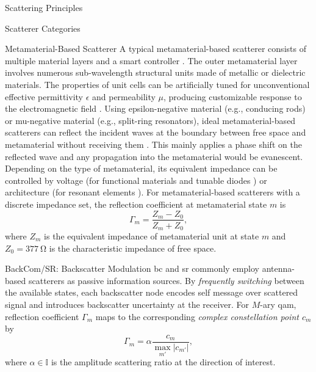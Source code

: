 \documentclass[journal]{IEEEtran}
\begin{document}
\begin{section}{Scattering Principles}
\begin{subsection}{Scatterer Categories}
		\begin{subsubsection}{Metamaterial-Based Scatterer}
			A typical metamaterial-based scatterer consists of multiple material layers and a smart controller \cite{Wu2020}.
			The outer metamaterial layer involves numerous sub-wavelength structural units made of metallic or dielectric materials.
			The properties of unit cells can be artificially tuned for unconventional effective permittivity $\epsilon$ and permeability $\mu$, producing customizable response to the electromagnetic field \cite{Zhou2021}.
			Using epsilon-negative material (e.g., conducing rods) or mu-negative material (e.g., split-ring resonators), ideal metamaterial-based scatterers can reflect the incident waves at the boundary between free space and metamaterial without receiving them \cite{Huang2021a}.
			This mainly applies a phase shift on the reflected wave and any propagation into the metamaterial would be evanescent.
			Depending on the type of metamaterial, its equivalent impedance can be controlled by voltage (for functional materials \cite{Singh2020} and tunable diodes \cite{Costa2021}) or architecture (for resonant elements \cite{Bialkowski2008}).
			For metamaterial-based scatterers with a discrete impedance set, the reflection coefficient at metamaterial state $m$ is
			\begin{equation}
				\Gamma_m = \frac{Z_m - Z_0}{Z_m + Z_0},
				\label{eq:reflection_pattern_metamaterial}
			\end{equation}
			where $Z_m$ is the equivalent impedance of metamaterial unit at state $m$ and $Z_0 = \qty{377}{\ohm}$ is the characteristic impedance of free space.
		\end{subsubsection}
	\end{subsection}

	\begin{subsection}{BackCom/SR: Backscatter Modulation}
		\gls{bc} and \gls{sr} commonly employ antenna-based scatterers as passive information sources.
		By \emph{frequently switching} between the available states, each backscatter node encodes self message over scattered signal and introduces backscatter uncertainty at the receiver.
		For $M$-ary \gls{qam}, reflection coefficient $\Gamma_m$ maps to the corresponding \emph{complex constellation point $c_m$} by
		\begin{equation}
			\Gamma_m = \alpha \frac{c_m}{\max_{m'} \lvert c_{m'} \rvert},
			\label{eq:backscatter_modulation}
		\end{equation}
		where $\alpha \in \mathbb{I}$ is the amplitude scattering ratio at the direction of interest.
	\end{subsection}


\end{section}
\end{document}
